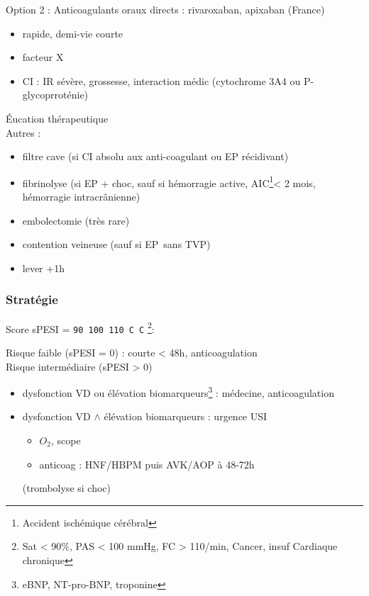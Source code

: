 \documentclass{book}
\begin{document}
Option 2 : Anticoagulants oraux directs : rivaroxaban, apixaban (France)

\begin{itemize}
\item rapide, demi-vie courte
\item facteur X
\item CI : IR sévère, grossesse, interaction médic (cytochrome 3A4 ou
P-glycoprroténie)
\end{itemize}

Éucation thérapeutique\\
Autres :

\begin{itemize}
\item filtre cave (si CI absolu aux anti-coagulant ou EP récidivant)
\item fibrinolyse (si EP + choc, sauf si hémorragie active,
AIC\footnote{Accident ischémique cérébral}< 2 mois,
hémorragie intracrânienne)
\item embolectomie (très rare)
\item contention veineuse (sauf si EP sans TVP)
\item lever +1h
\end{itemize}

\subsubsection{Stratégie}
\label{sec:orgf01da5d}
Score sPESI = \texttt{90 100 110 C C} \footnote{Sat < 90\%, PAS < 100 mmHg, FC > 110/min, Cancer, insuf Cardiaque chronique}:

Risque faible (sPESI = 0) : \faHospitalO{} courte < 48h, anticoagulation\\
Risque intermédiaire (sPESI > 0)

\begin{itemize}
\item dysfonction VD ou élévation biomarqueurs\footnote{eBNP, NT-pro-BNP, troponine} : \faHospitalO{}
médecine, anticoagulation
\item dysfonction VD \(\wedge\) élévation biomarqueurs : urgence \danger{}
\thus USI

\begin{itemize}
\item \(O_2\), scope
\item anticoag : HNF/HBPM puis AVK/AOP à 48-72h\\
\end{itemize}
(trombolyse si choc)
\end{itemize}
\end{document}
